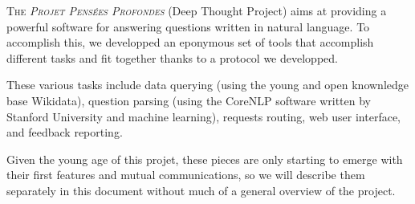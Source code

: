 \lettrine{T}{he {\em Projet Pensées Profondes}} (Deep Thought Project) aims
at providing a powerful software for answering questions written in
natural language.
To accomplish this, we developped an eponymous set of tools that
accomplish different tasks and fit together thanks to a protocol
we developped.

These various tasks include data querying (using the young and open
knownledge base Wikidata), question parsing (using the
CoreNLP software written by Stanford University and machine learning),
requests routing, web user interface, and feedback reporting.

Given the young age of this projet, these pieces are only starting
to emerge with their first features and mutual communications,
so we will describe them separately in this document without
much of a general overview of the project.
